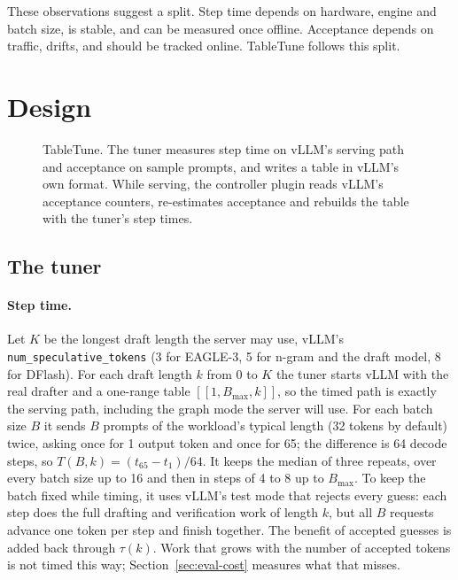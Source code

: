 \documentclass{article}
\newcommand{\sys}{TableTune}
\begin{document}
These observations suggest a split. Step time depends on hardware, engine and batch size, is stable, and can be measured once offline. Acceptance depends on traffic, drifts, and should be tracked online. \sys{} follows this split.

\section{Design}
\label{sec:design}

\begin{figure}[!b]
\centering
\resizebox{\columnwidth}{!}{}
\vspace{-5mm}
\caption{\sys{}. The tuner measures step time on vLLM's serving path and acceptance on sample prompts, and writes a table in vLLM's own format. While serving, the controller plugin reads vLLM's acceptance counters, re-estimates acceptance and rebuilds the table with the tuner's step times.}
\label{fig:design}
\vspace{-3mm}
\end{figure}

\subsection{The tuner}
\label{sec:tuner}

\paragraph{Step time.} Let $K$ be the longest draft length the server may use, vLLM's \texttt{num\_speculative\_tokens} (3 for EAGLE-3, 5 for n-gram and the draft model, 8 for DFlash). For each draft length $k$ from 0 to $K$ the tuner starts vLLM with the real drafter and a one-range table $[[1,B_{\max},k]]$, so the timed path is exactly the serving path, including the graph mode the server will use. For each batch size $B$ it sends $B$ prompts of the workload's typical length (32 tokens by default) twice, asking once for 1 output token and once for 65; the difference is 64 decode steps, so $T(B,k) = (t_{65}-t_{1})/64$. It keeps the median of three repeats, over every batch size up to 16 and then in steps of 4 to 8 up to $B_{\max}$. To keep the batch fixed while timing, it uses vLLM's test mode that rejects every guess: each step does the full drafting and verification work of length $k$, but all $B$ requests advance one token per step and finish together. The benefit of accepted guesses is added back through $\tau(k)$. Work that grows with the number of accepted tokens is not timed this way; Section~\ref{sec:eval-cost} measures what that misses.
\end{document}
